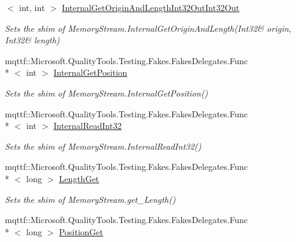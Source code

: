 \begin{DoxyCompactItemize}
$<$ int, int $>$ \hyperlink{class_system_1_1_i_o_1_1_fakes_1_1_shim_memory_stream_ab30b1c32b7a778bdb24137ddf2e04c20}{Internal\-Get\-Origin\-And\-Length\-Int32\-Out\-Int32\-Out}
\begin{DoxyCompactList}\small\item\em Sets the shim of Memory\-Stream.\-Internal\-Get\-Origin\-And\-Length(Int32\& origin, Int32\& length)\end{DoxyCompactList}\item 
mqttf\-::\-Microsoft.\-Quality\-Tools.\-Testing.\-Fakes.\-Fakes\-Delegates.\-Func\\*
$<$ int $>$ \hyperlink{class_system_1_1_i_o_1_1_fakes_1_1_shim_memory_stream_aea602313fdbbea76928ef0d283b430ec}{Internal\-Get\-Position}
\begin{DoxyCompactList}\small\item\em Sets the shim of Memory\-Stream.\-Internal\-Get\-Position()\end{DoxyCompactList}\item 
mqttf\-::\-Microsoft.\-Quality\-Tools.\-Testing.\-Fakes.\-Fakes\-Delegates.\-Func\\*
$<$ int $>$ \hyperlink{class_system_1_1_i_o_1_1_fakes_1_1_shim_memory_stream_a998bb87a46a82d3fcf753ab574727fbc}{Internal\-Read\-Int32}
\begin{DoxyCompactList}\small\item\em Sets the shim of Memory\-Stream.\-Internal\-Read\-Int32()\end{DoxyCompactList}\item 
mqttf\-::\-Microsoft.\-Quality\-Tools.\-Testing.\-Fakes.\-Fakes\-Delegates.\-Func\\*
$<$ long $>$ \hyperlink{class_system_1_1_i_o_1_1_fakes_1_1_shim_memory_stream_ab167b650091939f97af121be5e314716}{Length\-Get}
\begin{DoxyCompactList}\small\item\em Sets the shim of Memory\-Stream.\-get\-\_\-\-Length()\end{DoxyCompactList}\item 
mqttf\-::\-Microsoft.\-Quality\-Tools.\-Testing.\-Fakes.\-Fakes\-Delegates.\-Func\\*
$<$ long $>$ \hyperlink{class_system_1_1_i_o_1_1_fakes_1_1_shim_memory_stream_ac5c60e0e13bf6c303376ad4d7084ae5a}{Position\-Get}

\end{DoxyCompactItemize}
